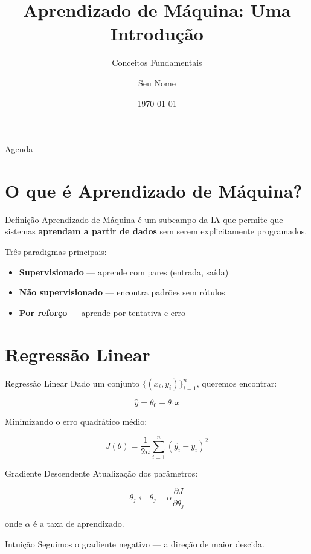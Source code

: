 \documentclass{beamer}
\title{Aprendizado de Máquina: Uma Introdução}
\subtitle{Conceitos Fundamentais}
\author{Seu Nome}
\date{\today}
\institute{Sua Instituição}
\begin{document}
\begin{frame}
\titlepage
\end{frame}

\begin{frame}{Agenda}
\tableofcontents
\end{frame}

\section{O que é Aprendizado de Máquina?}

\begin{frame}{Definição}
  Aprendizado de Máquina é um subcampo da IA que permite que sistemas
  \textbf{aprendam a partir de dados} sem serem explicitamente programados.

  \bigskip
  Três paradigmas principais:
  \begin{itemize}
    \item \textbf{Supervisionado} — aprende com pares (entrada, saída)
    \item \textbf{Não supervisionado} — encontra padrões sem rótulos
    \item \textbf{Por reforço} — aprende por tentativa e erro
  \end{itemize}
\end{frame}

\section{Regressão Linear}

\begin{frame}{Regressão Linear}
  Dado um conjunto $\{(x_i, y_i)\}_{i=1}^n$, queremos encontrar:

  \[
  \hat{y} = \theta_0 + \theta_1 x
  \]

  Minimizando o erro quadrático médio:

  \[
  J(\theta) = \frac{1}{2n} \sum_{i=1}^{n} \left(\hat{y}_i - y_i\right)^2
  \]
\end{frame}

\begin{frame}{Gradiente Descendente}
  Atualização dos parâmetros:

  \[
  \theta_j \leftarrow \theta_j - \alpha \frac{\partial J}{\partial \theta_j}
  \]

  onde $\alpha$ é a taxa de aprendizado.

  \begin{block}{Intuição}
    Seguimos o gradiente negativo — a direção de maior descida.
  \end{block}
\end{frame}
\end{document}

